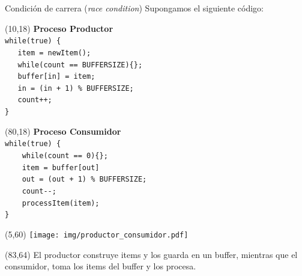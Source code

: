 \documentclass[aspectratio=169]{beamer}
\begin{document}
\begin{frame}[fragile,t]{Condición de carrera (\emph{race condition})}
    Supongamos el siguiente código:\\
    \begin{textblock}{70}(10,18)
    \textbf{Proceso Productor}\\
    \vspace{0.3cm}
    \footnotesize
    \verb|while(true) {                   |\\
    \color{verdeuca}
    \verb|   item = newItem();            |\\
    \vspace{0.2cm}
    \color{rojo}
    \verb|   while(count == BUFFERSIZE){};|\\
    \vspace{0.2cm}
    \color{black}
    \verb|   buffer[in] = item;           |\\
    \verb|   in = (in + 1) % BUFFERSIZE;  |\\
    \verb|   count++;                     |\\
    \verb|}                               |\\
    \end{textblock}
    \begin{textblock}{70}(80,18)
    \textbf{Proceso Consumidor}\\
    \vspace{0.3cm}
    \footnotesize
    \verb|while(true) {                    |\\
    \color{rojo}
    \verb|    while(count == 0){};         |\\
    \color{black}
    \vspace{0.2cm}
    \verb|    item = buffer[out]           |\\
    \verb|    out = (out + 1) % BUFFERSIZE;|\\
    \verb|    count--;                     |\\
    \vspace{0.2cm}
    \color{verdeuca}
    \verb|    processItem(item);           |\\
    \color{black}
    \verb|}                                |\\
    \end{textblock}
    \begin{textblock}{70}(5,60)
    \texttt{[image: img/productor\_consumidor.pdf]}
    \end{textblock}
    \begin{textblock}{63}(83,64)
    El productor construye items y los guarda en un buffer, mientras que el consumidor, toma los items del buffer y los procesa.
    \end{textblock}
\end{frame}
\end{document}
